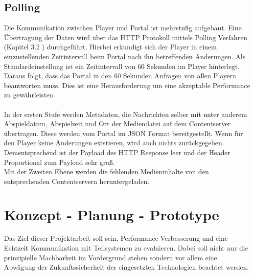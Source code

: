 \section{Polling}
\label{sec:Polling}
Die Kommunikation zwischen Player und Portal ist mehrstufig aufgebaut. Eine Übertragung der Daten wird über das HTTP Protokoll mittels Polling Verfahren (Kapitel 3.2 \cite{Interaktives Monitorsystem zur besonderen medialen Darstellung von Produkten am Point of Sale}) durchgeführt. Hierbei erkundigt sich der Player in einem einzustellenden Zeitintervall beim Portal nach ihn betreffenden Änderungen. Als Standardeinstellung ist ein Zeitintervall von 60 Sekunden im Player hinterlegt. Daraus folgt, dass das Portal in den 60 Sekunden Anfragen von allen Playern beantworten muss. Dies ist eine Herausforderung um eine akzeptable Performance zu gewährleisten.
\\\\In der ersten Stufe werden Metadaten, \zB die Nachrichten selber mit unter anderem Abspieldatum, Abspielzeit und Ort der Mediendatei auf dem Contentserver übertragen. Diese werden vom Portal im JSON Format bereitgestellt. Wenn für den Player keine Änderungen existieren, wird auch nichts zurückgegeben. Dementsprechend ist der Payload des HTTP Response leer und der Header Proportional zum Payload sehr groß.
\\Mit der Zweiten Ebene werden die fehlenden Medieninhalte von den entsprechenden Contentservern heruntergeladen.



\chapter{Konzept - Planung - Prototype}
\label{cha:Konzept - Planung}

Das Ziel dieser Projektarbeit soll sein, Performance Verbesserung und eine Echtzeit Kommunikation mit Teilsystemen zu evaluieren. Dabei soll nicht nur die prinzipielle Machbarkeit im Vordergrund stehen sondern vor allem eine Abwägung der Zukunftssicherheit der eingesetzten Technologien beachtet werden.


